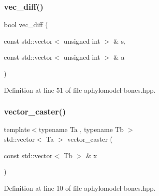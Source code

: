 \mbox{\label{aphylomodel-bones_8hpp_ac4e3e3e3920b3bbde57ac1ed395e9983}} 
\subsubsection{\texorpdfstring{vec\+\_\+diff()}{vec\_diff()}}
{\footnotesize\ttfamily bool vec\+\_\+diff (\begin{DoxyParamCaption}\item[{const std\+::vector$<$ unsigned int $>$ \&}]{s,  }\item[{const std\+::vector$<$ unsigned int $>$ \&}]{a }\end{DoxyParamCaption})\hspace{0.3cm}{\ttfamily [inline]}}



Definition at line 51 of file aphylomodel-\/bones.\+hpp.

\mbox{\label{aphylomodel-bones_8hpp_a13c91ee42db6c3b986acbbac4ee58cb0}} 
\subsubsection{\texorpdfstring{vector\+\_\+caster()}{vector\_caster()}}
{\footnotesize\ttfamily template$<$typename Ta , typename Tb $>$ \\
std\+::vector$<$ Ta $>$ vector\+\_\+caster (\begin{DoxyParamCaption}\item[{const std\+::vector$<$ Tb $>$ \&}]{x }\end{DoxyParamCaption})\hspace{0.3cm}{\ttfamily [inline]}}



Definition at line 10 of file aphylomodel-\/bones.\+hpp.

